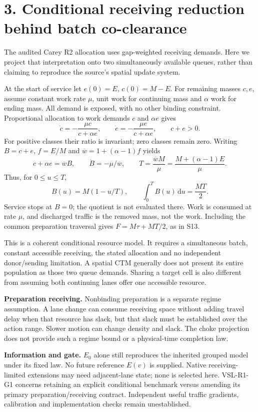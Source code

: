 \documentclass[11pt]{article}
\newcommand{\dd}{\mathrm{d}}
\begin{document}
\newpage
\section*{3. Conditional receiving reduction behind batch co-clearance}
The audited Carey R2 allocation uses gap-weighted receiving demands. Here we
project that interpretation onto two simultaneously available queues, rather
than claiming to reproduce the source's spatial update system.

At the start of service let $e(0)=E$, $c(0)=M-E$. For remaining masses $c,e$,
assume constant work rate $\mu$, unit work for continuing mass and $\alpha$
work for ending mass. All demand is exposed, with no other binding constraint.
Proportional allocation to work demands $c$ and $\alpha e$ gives
\begin{equation}
 \dot c=-\frac{\mu c}{c+\alpha e},\qquad
 \dot e=-\frac{\mu e}{c+\alpha e},
 \qquad c+e>0.
 \label{eq:allocation}
\end{equation}
For positive classes their ratio is invariant; zero classes remain zero.
Writing $B=c+e$, $f=E/M$ and $\overline w=1+(\alpha-1)f$ yields
\begin{equation}
 c+\alpha e=\overline w B,\qquad
 \dot B=-\mu/\overline w,\qquad
 T=\frac{\overline w M}{\mu}=\frac{M+(\alpha-1)E}{\mu}.
 \label{eq:linear}
\end{equation}
Thus, for $0\le u\le T$,
\begin{equation}
 B(u)=M(1-u/T),\qquad
 \int_0^T B(u)\,\dd u=\frac{MT}{2}.
 \label{eq:area}
\end{equation}
Service stops at $B=0$; the quotient is not evaluated there. Work is consumed
at rate $\mu$, and discharged traffic is the removed mass, not the work.
Including the common preparation traversal gives $F=M\tau+MT/2$, as in S13.

This is a coherent conditional resource model. It requires a simultaneous
batch, constant accessible receiving, the stated allocation and no independent
donor/sending limitation. A spatial CTM generally does not present its entire
population as those two queue demands. Sharing a target cell is also different
from assuming both continuing lanes offer one accessible resource.

\textbf{Preparation receiving.} Nonbinding preparation is a separate regime
assumption. A lane change can consume receiving space without adding travel
delay when that resource has slack, but that slack must be established over the
action range. Slower motion can change density and slack. The choke projection
does not provide such a regime bound or a physical-time completion law.

\textbf{Information and gate.} $E_0$ alone still reproduces the inherited
grouped model under its fixed law. No future reference $E(v)$ is supplied.
Native receiving-limited extensions may need adjacent-lane state; none is
selected here. VSL-R1-G1 concerns retaining an explicit conditional benchmark
versus amending its primary preparation/receiving contract. Independent useful
traffic gradients, calibration and implementation checks remain unestablished.
\end{document}
